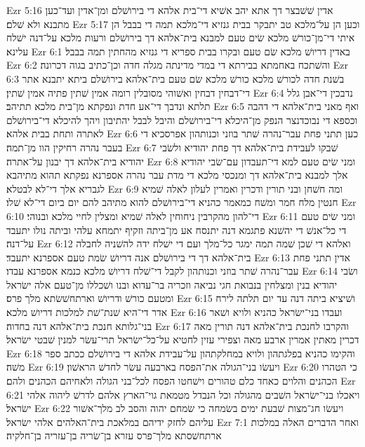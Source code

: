 Ezr 5:16  אדין שׁשׁבצר דך אתא יהב אשׁיא די־בית אלהא די בירושׁלם ומן־אדין ועד־כען מתבנא ולא שׁלם׃
Ezr 5:17  וכען הן על־מלכא טב יתבקר בבית גנזיא די־מלכא תמה די בבבל הן איתי די־מן־כורשׁ מלכא שׂים טעם למבנא בית־אלהא דך בירושׁלם ורעות מלכא על־דנה ישׁלח עלינא׃
Ezr 6:1  באדין דריושׁ מלכא שׂם טעם ובקרו בבית ספריא די גנזיא מהחתין תמה בבבל׃
Ezr 6:2  והשׁתכח באחמתא בבירתא די במדי מדינתה מגלה חדה וכן־כתיב בגוה דכרונה׃
Ezr 6:3  בשׁנת חדה לכורשׁ מלכא כורשׁ מלכא שׂם טעם בית־אלהא בירושׁלם ביתא יתבנא אתר די־דבחין דבחין ואשׁוהי מסובלין רומה אמין שׁתין פתיה אמין שׁתין׃
Ezr 6:4  נדבכין די־אבן גלל תלתא ונדבך די־אע חדת ונפקתא מן־בית מלכא תתיהב׃
Ezr 6:5  ואף מאני בית־אלהא די דהבה וכספא די נבוכדנצר הנפק מן־היכלא די־בירושׁלם והיבל לבבל יהתיבון ויהך להיכלא די־בירושׁלם לאתרה ותחת בבית אלהא׃
Ezr 6:6  כען תתני פחת עבר־נהרה שׁתר בוזני וכנותהון אפרסכיא די בעבר נהרה רחיקין הוו מן־תמה׃
Ezr 6:7  שׁבקו לעבידת בית־אלהא דך פחת יהודיא ולשׂבי יהודיא בית־אלהא דך יבנון על־אתרה׃
Ezr 6:8  ומני שׂים טעם למא די־תעבדון עם־שׂבי יהודיא אלך למבנא בית־אלהא דך ומנכסי מלכא די מדת עבר נהרה אספרנא נפקתא תהוא מתיהבא לגבריא אלך די־לא לבטלא׃
Ezr 6:9  ומה חשׁחן ובני תורין ודכרין ואמרין לעלון לאלה שׁמיא חנטין מלח חמר ומשׁח כמאמר כהניא די־בירושׁלם להוא מתיהב להם יום ביום די־לא שׁלו׃
Ezr 6:10  די־להון מהקרבין ניחוחין לאלה שׁמיא ומצלין לחיי מלכא ובנוהי׃
Ezr 6:11  ומני שׂים טעם די כל־אנשׁ די יהשׁנא פתגמא דנה יתנסח אע מן־ביתה וזקיף יתמחא עלהי וביתה נולו יתעבד על־דנה׃
Ezr 6:12  ואלהא די שׁכן שׁמה תמה ימגר כל־מלך ועם די ישׁלח ידה להשׁניה לחבלה בית־אלהא דך די בירושׁלם אנה דריושׁ שׂמת טעם אספרנא יתעבד׃
Ezr 6:13  אדין תתני פחת עבר־נהרה שׁתר בוזני וכנותהון לקבל די־שׁלח דריושׁ מלכא כנמא אספרנא עבדו׃
Ezr 6:14  ושׂבי יהודיא בנין ומצלחין בנבואת חגי נביאה וזכריה בר־עדוא ובנו ושׁכללו מן־טעם אלה ישׂראל ומטעם כורשׁ ודריושׁ וארתחשׁשׂתא מלך פרס׃
Ezr 6:15  ושׁיציא ביתה דנה עד יום תלתה לירח אדר די־היא שׁנת־שׁת למלכות דריושׁ מלכא׃
Ezr 6:16  ועבדו בני־ישׂראל כהניא ולויא ושׁאר בני־גלותא חנכת בית־אלהא דנה בחדוה׃
Ezr 6:17  והקרבו לחנכת בית־אלהא דנה תורין מאה דכרין מאתין אמרין ארבע מאה וצפירי עזין לחטיא על־כל־ישׂראל תרי־עשׂר למנין שׁבטי ישׂראל׃
Ezr 6:18  והקימו כהניא בפלגתהון ולויא במחלקתהון על־עבידת אלהא די בירושׁלם ככתב ספר משׁה׃
Ezr 6:19  ויעשׂו בני־הגולה את־הפסח בארבעה עשׂר לחדשׁ הראשׁון׃
Ezr 6:20  כי הטהרו הכהנים והלוים כאחד כלם טהורים וישׁחטו הפסח לכל־בני הגולה ולאחיהם הכהנים ולהם׃
Ezr 6:21  ויאכלו בני־ישׂראל השׁבים מהגולה וכל הנבדל מטמאת גוי־הארץ אלהם לדרשׁ ליהוה אלהי ישׂראל׃
Ezr 6:22  ויעשׂו חג־מצות שׁבעת ימים בשׂמחה כי שׂמחם יהוה והסב לב מלך־אשׁור עליהם לחזק ידיהם במלאכת בית־האלהים אלהי ישׂראל׃
Ezr 7:1  ואחר הדברים האלה במלכות ארתחשׁסתא מלך־פרס עזרא בן־שׂריה בן־עזריה בן־חלקיה׃
